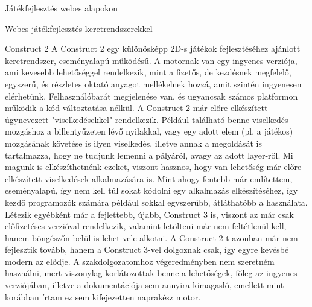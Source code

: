 \begin{MyChapter}{Játékfejlesztés webes alapokon}
\begin{MySection}{Webes játékfejlesztés keretrendszerekkel}
		\begin{MySubSection}{Construct 2}
			A Construct 2 egy különösképp 2D-s játékok fejlesztéséhez ajánlott keretrendszer, eseményalapú működésű. A motornak van egy ingyenes verziója, ami kevesebb lehetőséggel rendelkezik, mint a fizetős, de kezdésnek megfelelő, egyszerű, és részletes oktató anyagot mellékelnek hozzá, amit szintén ingyenesen elérhetünk. Felhasználóbarát megjelenése van, és ugyancsak számos platformon működik a kód változtatása nélkül.
			A Construct 2 már előre elkészített úgynevezett "viselkedésekkel" rendelkezik. Például található benne viselkedés mozgáshoz a billentyűzeten lévő nyilakkal, vagy egy adott elem (pl. a játékos) mozgásának követése is ilyen viselkedés, illetve annak a megoldását is tartalmazza, hogy ne tudjunk lemenni a pályáról, avagy az adott layer-ről. Mi magunk is elkészíthetnénk ezeket, viszont hasznos, hogy van lehetőség már előre elkészített viselkedések alkalmazására is.
			Mint ahogy fentebb már említettem, eseményalapú, így nem kell túl sokat kódolni egy alkalmazás elkészítéséhez, így kezdő programozók számára például sokkal egyszerűbb, átláthatóbb a használata.
			Létezik egyébként már a fejlettebb, újabb, Construct 3 is, viszont az már csak előfizetéses verzióval rendelkezik, valamint letölteni már nem feltétlenül kell, hanem böngészőn belül is lehet vele alkotni.
			A Construct 2-t azonban már nem fejlesztik tovább, hanem a Construct 3-vel dolgoznak csak, így egyre kevésbé modern az elődje.
			A szakdolgozatomhoz végeredményben nem szeretném használni, mert viszonylag korlátozottak benne a lehetőségek, főleg az ingyenes verziójában, illetve a dokumentációja sem annyira kimagasló, emellett mint korábban írtam ez sem kifejezetten naprakész motor. 
			
		\end{MySubSection}
			

\end{MySection}
\end{MyChapter}
